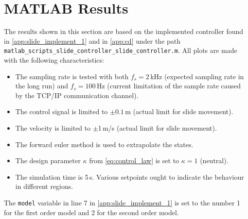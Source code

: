 \section{MATLAB Results}\label{sec:matlab-results-slide-safety}
\vspace{-0.2cm}
The results shown in this section are based on the implemented controller found in \autoref{app:slide_implement_1} and in \autoref{app:cd} under the path \texttt{matlab\_scripts\_slide\_controller\_slide\_controller.m}. All plots are made with the following characteristics:
\begin{itemize}
\item The sampling rate is tested with both $f_s = 2\,$kHz (expected sampling rate in the long run) and $f_s = 100\,$Hz (current limitation of the sample rate caused by the TCP/IP communication channel).
\item The control signal is limited to $\pm 0.1$\,m (actual limit for slide movement).
\item The velocity is limited to $\pm$1\,m/s (actual limit for slide movement).
\item The forward euler method is used to extrapolate the states.
\item The design parameter $\kappa$ from \autoref{eq:control_law} is set to $\kappa=1$ (neutral).
\item The simulation time is 5\,s. Various setpoints ought to indicate the behaviour in different regions.
\end{itemize}
The \texttt{model} variable in line 7 in \autoref{app:slide_implement_1} is set to the number 1 for the first order model and 2 for the second order model. 
\vspace{-0.3cm}

